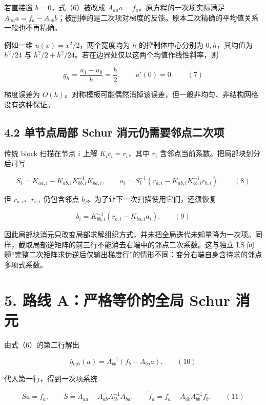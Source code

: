 \documentclass[
  11pt,
  a4paper,
]{article}
\begin{document}
若直接置 \(b=0\)，式（6）被改成 \(A_{aa}a=f_a\)。原方程的一次项实际满足
\(A_{aa}a=f_a-A_{ab}b\)；被删掉的是二次项对梯度的反馈。原本二次精确的平均值关系一般也不再精确。

例如一维 \(u(x)=x^2/2\)，两个宽度均为 \(h\) 的控制体中心分别为
\(0,h\)，其均值为 \(h^2/24\) 与
\(h^2/2+h^2/24\)。若在边界处仅以这两个均值作线性斜率，则

\[
g_h=\frac{\bar u_1-\bar u_0}{h}=\frac h2,
\qquad u'(0)=0. \qquad(7)
\]

梯度误差为
\(O(h)\)。对称模板可能偶然消掉该误差，但一般非均匀、非结构网格没有这种保证。

\hypertarget{ux5355ux8282ux70b9ux5c40ux90e8-schur-ux6d88ux5143ux4ecdux9700ux8981ux90bbux70b9ux4e8cux6b21ux9879}{%
\subsection{4.2 单节点局部 Schur
消元仍需要邻点二次项}\label{ux5355ux8282ux70b9ux5c40ux90e8-schur-ux6d88ux5143ux4ecdux9700ux8981ux90bbux70b9ux4e8cux6b21ux9879}}

传统 block 扫描在节点 \(i\) 上解 \(K_i c_i=r_i\)，其中 \(r_i\)
含邻点当前系数。把局部块划分后可写

\[
S_i=K_{aa,i}-K_{ab,i}K_{bb,i}^{-1}K_{ba,i},\qquad
a_i=S_i^{-1}(r_{a,i}-K_{ab,i}K_{bb,i}^{-1}r_{b,i}). \qquad(8)
\]

但 \(r_{a,i}\)、\(r_{b,i}\) 仍包含邻点
\(b_j\)。为了让下一次扫描使用它们，还须恢复

\[
b_i=K_{bb,i}^{-1}(r_{b,i}-K_{ba,i}a_i). \qquad(9)
\]

因此局部块消元只改变局部求解组织方式，并未把全局迭代未知量降为一次项。同样，截取局部逆矩阵的前三行不能消去右端中的邻点二次系数。这与独立
LS
问题``完整二次矩阵求伪逆后仅输出梯度行''的情形不同：变分右端自身含待求的邻点多项式系数。

\hypertarget{ux8defux7ebf-aux4e25ux683cux7b49ux4ef7ux7684ux5168ux5c40-schur-ux6d88ux5143}{%
\section{5. 路线 A：严格等价的全局 Schur
消元}\label{ux8defux7ebf-aux4e25ux683cux7b49ux4ef7ux7684ux5168ux5c40-schur-ux6d88ux5143}}

由式（6）的第二行解出

\[
b_{\mathrm{opt}}(a)=A_{bb}^{-1}(f_b-A_{ba}a). \qquad(10)
\]

代入第一行，得到一次项系统

\[
Sa=\widetilde f_a,\qquad
S=A_{aa}-A_{ab}A_{bb}^{-1}A_{ba},\qquad
\widetilde f_a=f_a-A_{ab}A_{bb}^{-1}f_b. \qquad(11)
\]
\end{document}
